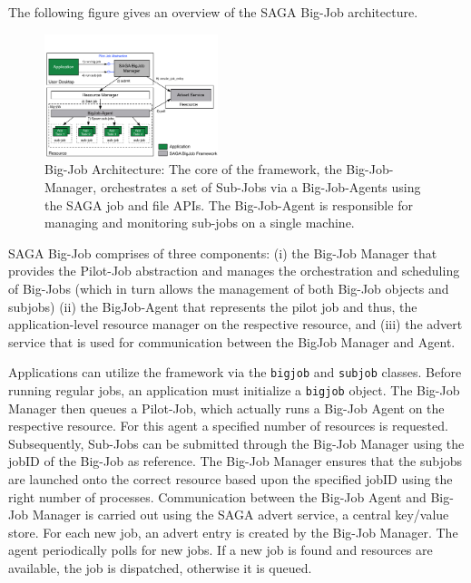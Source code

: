 \documentclass[conference,final]{IEEEtran}
\begin{document}

The following figure gives an overview of the SAGA Big-Job architecture.

\begin{figure}[htbp]
    \centering
    \includegraphics[width=0.45\textwidth]{figures/bigjob}
    \caption{Big-Job Architecture: The core of the framework, the Big-Job-Manager,
     orchestrates a set of Sub-Jobs via a Big-Job-Agents using the SAGA job and file APIs. 
     The Big-Job-Agent is responsible for managing and monitoring sub-jobs on a 
     single machine.}
    \label{fig:figures_bigjob}
\end{figure}

SAGA Big-Job comprises of three components: (i) the Big-Job Manager
that provides the Pilot-Job abstraction and manages the orchestration
and scheduling of Big-Jobs (which in turn allows the management of
both Big-Job objects and subjobs) (ii) the BigJob-Agent that
represents the pilot job and thus, the application-level resource
manager on the respective resource, and (iii) the advert service that
is used for communication between the BigJob Manager and Agent.

Applications can utilize the framework via the \texttt{bigjob} and
\texttt{subjob} classes.  Before running regular jobs, an application
must initialize a \texttt{bigjob} object.  The Big-Job Manager then
queues a Pilot-Job, which actually runs a Big-Job Agent on the
respective resource. For this agent a specified number of resources is
requested. Subsequently, Sub-Jobs can be submitted through the Big-Job
Manager using the jobID of the Big-Job as reference. The Big-Job
Manager ensures that the subjobs are launched onto the correct
resource based upon the specified jobID using the right number of
processes. Communication between the Big-Job Agent and Big-Job Manager
is carried out using the SAGA advert service, a central key/value
store. For each new job, an advert entry is created by the Big-Job
Manager. The agent periodically polls for new jobs. If a new job is
found and resources are available, the job is dispatched, otherwise it
is queued.
\end{document}
